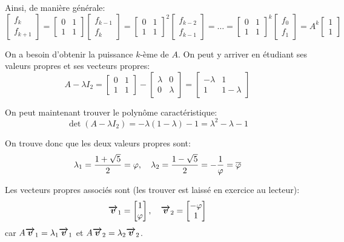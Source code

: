 \documentclass[a4paper]{article}
\begin{document}
{    Ainsi, de manière générale: 
    \[\begin{bmatrix} f_k \\ f_{k+1} \end{bmatrix} = \begin{bmatrix} 0 & 1 \\ 1 & 1 \end{bmatrix} \begin{bmatrix} f_{k-1} \\ f_{k} \end{bmatrix} = \begin{bmatrix} 0 & 1 \\ 1 & 1 \end{bmatrix}^2 \begin{bmatrix} f_{k-2} \\ f_{k-1} \end{bmatrix} = \ldots = \begin{bmatrix} 0 & 1 \\ 1 & 1 \end{bmatrix}^{k} \begin{bmatrix} f_0 \\ f_1 \end{bmatrix} = A^{k} \begin{bmatrix} 1 \\ 1 \end{bmatrix} \]
    
    On a besoin d'obtenir la puissance $k$-ème de $A$. On peut y arriver en étudiant ses valeurs propres et ses vecteurs propres: 
    \[A - \lambda I_2 = \begin{bmatrix} 0 & 1 \\ 1 & 1 \end{bmatrix} - \begin{bmatrix} \lambda & 0 \\ 0 & \lambda \end{bmatrix} = \begin{bmatrix} -\lambda & 1 \\ 1 & 1 - \lambda \end{bmatrix}  \]

    On peut maintenant trouver le polynôme caractéristique: 
    \[\det\left(A - \lambda I_2\right) = -\lambda\left(1 - \lambda\right) -1 = \lambda^2 - \lambda - 1\]
    
    On trouve donc que les deux valeurs propres sont: 
    \[\lambda_1 = \frac{1 + \sqrt{5}}{2} = \varphi, \quad \lambda_2 = \frac{1 - \sqrt{5}}{2} = -\frac{1}{\varphi} = \overline{\varphi}\]
    
    Les vecteurs propres associés sont (les trouver est laissé en exercice au lecteur): 
    \[\bm{\protect\overrightarrow{v}}_1 = \begin{bmatrix} 1 \\ \varphi \end{bmatrix}, \quad \bm{\protect\overrightarrow{v}}_2 = \begin{bmatrix} -\varphi \\ 1 \end{bmatrix} \]
    car $A \bm{\protect\overrightarrow{v}}_1 = \lambda_1 \bm{\protect\overrightarrow{v}}_1$ et $A \bm{\protect\overrightarrow{v}}_2 = \lambda_2 \bm{\protect\overrightarrow{v}}_2$.

}
\end{document}
